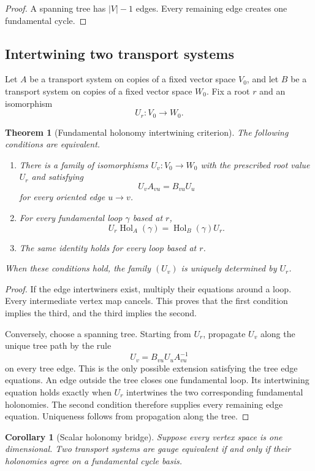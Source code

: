 \documentclass[11pt,a4paper]{article}
\newtheorem{theorem}{Theorem}[section]
\theoremstyle{plain}
\newtheorem{corollary}[corollary]{Corollary}
\theoremstyle{definition}
\theoremstyle{remark}
\newcommand{\Hol}{\operatorname{Hol}}
\begin{document}
\begin{proof}
A spanning tree has $|V|-1$ edges.  Every remaining edge creates one fundamental cycle.
\end{proof}


\subsection{Intertwining two transport systems}

Let $A$ be a transport system on copies of a fixed vector space $V_0$, and let $B$ be a transport system on copies of a fixed vector space $W_0$.  Fix a root $r$ and an isomorphism
\[
U_r:V_0\longrightarrow W_0.
\]

\begin{theorem}[Fundamental holonomy intertwining criterion]\label{thm:holonomy_intertwining}
The following conditions are equivalent.
\begin{enumerate}
\item There is a family of isomorphisms $U_v:V_0\to W_0$ with the prescribed root value $U_r$ and satisfying
\[
U_vA_{vu}=B_{vu}U_u
\]
for every oriented edge $u\to v$.
\item For every fundamental loop $\gamma$ based at $r$,
\[
U_r\Hol_A(\gamma)=\Hol_B(\gamma)U_r.
\]
\item The same identity holds for every loop based at $r$.
\end{enumerate}
When these conditions hold, the family $(U_v)$ is uniquely determined by $U_r$.
\end{theorem}

\begin{proof}
If the edge intertwiners exist, multiply their equations around a loop.  Every intermediate vertex map cancels.  This proves that the first condition implies the third, and the third implies the second.

Conversely, choose a spanning tree.  Starting from $U_r$, propagate $U_v$ along the unique tree path by the rule
\[
U_v=B_{vu}U_uA_{vu}^{-1}
\]
on every tree edge.  This is the only possible extension satisfying the tree edge equations.  An edge outside the tree closes one fundamental loop.  Its intertwining equation holds exactly when $U_r$ intertwines the two corresponding fundamental holonomies.  The second condition therefore supplies every remaining edge equation.  Uniqueness follows from propagation along the tree.
\end{proof}

\begin{corollary}[Scalar holonomy bridge]\label{cor:scalar_holonomy_bridge}
Suppose every vertex space is one dimensional.  Two transport systems are gauge equivalent if and only if their holonomies agree on a fundamental cycle basis.
\end{corollary}
\end{document}

